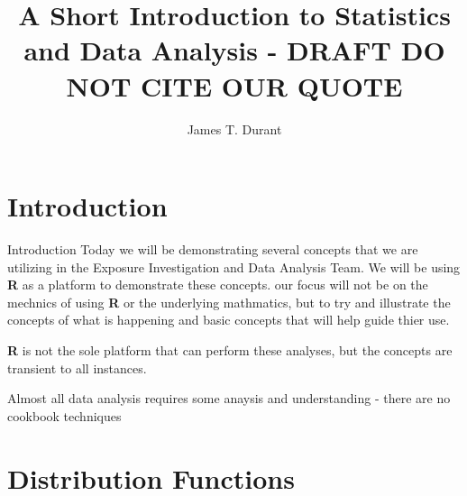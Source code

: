 \documentclass{beamer}
\title[Statistics and Data Analysis]{A Short Introduction to Statistics and Data Analysis - DRAFT DO NOT CITE OUR QUOTE}
\author{James T. Durant}
\begin{document}


\begin{frame}
\titlepage
\end{frame}

\section{Introduction}
\begin{frame}{Introduction}
Today we will be demonstrating several concepts that we are utilizing in the Exposure Investigation and Data Analysis Team. We will be using \textbf{R} as a platform to demonstrate these concepts. our focus will not be on the mechnics of using \textbf{R} or the underlying mathmatics, but to try and illustrate the concepts of what is happening and basic concepts that will help guide thier use.

 \textbf{R} is not the sole platform that can perform these analyses, but the concepts are transient to all instances.

\alert{Almost all data analysis requires some anaysis and understanding - there are no cookbook techniques }

\end{frame}

\section{Distribution Functions}
\end{document}
